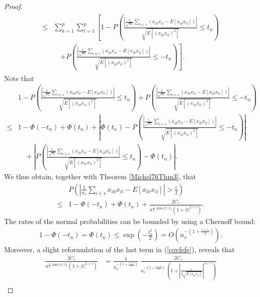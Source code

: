 \documentclass[Research_Module_ES.tex]{subfiles}
\begin{document}
\begin{proof}
\begin{align}
\begin{split}\label{dreieck}
\leq&\sum_{k=1}^{p}\sum_{l=1}^{p}\left[ 1-P\left( \frac{\left|\frac{1}{\sqrt{n_v}}\sum_{i\in s}\left(x_{ik}x_{il}-E[x_{ik}x_{il}]\right)\right|}{\sqrt{E[(x_{ik}x_{il})^2]}}\leq t_n \right) \right.\\
&\quad\left. + P\left( \frac{\left|\frac{1}{\sqrt{n_v}}\sum_{i\in s}\left(x_{ik}x_{il}-E[x_{ik}x_{il}]\right)\right|}{\sqrt{E[(x_{ik}x_{il})^2]}}\leq -t_n \right) \right].
\end{split}
\end{align}
Note that
\begin{align*}
 &1-P\left( \frac{\left|\frac{1}{\sqrt{n_v}}\sum_{i\in s}\left(x_{ik}x_{il}-E[x_{ik}x_{il}]\right)\right|}{\sqrt{E[(x_{ik}x_{il})^2]}}\leq t_n \right) + P\left( \frac{\left|\frac{1}{\sqrt{n_v}}\sum_{i\in s}\left(x_{ik}x_{il}-E[x_{ik}x_{il}]\right)\right|}{\sqrt{E[(x_{ik}x_{il})^2]}}\leq -t_n \right) \\
 \leq&1-\Phi(-t_n)+\Phi(t_n)+\left| \Phi(t_n)-P\left( \frac{\left|\frac{1}{\sqrt{n_v}}\sum_{i\in s}\left(x_{ik}x_{il}-E[x_{ik}x_{il}]\right)\right|}{\sqrt{E[(x_{ik}x_{il})^2]}}\leq -t_n\right) \right|\\
 &\quad+ \left|P\left(\frac{\left|\frac{1}{\sqrt{n_v}}\sum_{i\in s}\left(x_{ik}x_{il}-E[x_{ik}x_{il}]\right)\right|}{\sqrt{E[(x_{ik}x_{il})^2]}} \leq t_n\right) -\Phi(t_n)\right|.
\end{align*}
We thus obtain, together with Theorem \ref{Michel76Thm3}, that
\begin{align}
&P\left(\left| \frac{1}{n_v}\sum_{i\in s}x_{ik}x_{il}-E[x_{ik} x_{il}] \right|>\frac{\varepsilon}{2}\right)\\
\leq&1-\Phi(-t_n)+\Phi(t_n)+\frac{2C_\tau}{n^{\frac{1}{2}~ \min\{\tau,1\}} (1+|t|^{2+\tau}) }.\label{covfefe}
\end{align}
The rates of the normal probabilities can be bounded by using a Chernoff bound:
\begin{align*}
1-\Phi(-t_n)=\Phi(t_n)\leq\exp\left(-\frac{t_n^2}{2}\right)=O\left(n_v^{-\left(1+\frac{\tau+1}{2}\right)}\right).
\end{align*}
Moreover, a slight reformulation of the last term in (\ref{covfefe}), reveals that
\begin{align*}
\frac{2C_\tau}{n^{\frac{1}{2}~ \min\{\tau,1\}} (1+|t|^{2+\tau}) }&=\frac{1}{n_v^{-\left(1+\frac{\tau+1}{2}\right)}}~\frac{2C_\tau}{n_v^{-\left( 1+\frac{\tau+1}{2} \right)} ~\left(1+\left|  \frac{\varepsilon}{2\sqrt{E[x_{ik}x_{il}]}} \right|^{2+\tau}\right)  }\\

\end{align*}
\end{proof}
\end{document}

